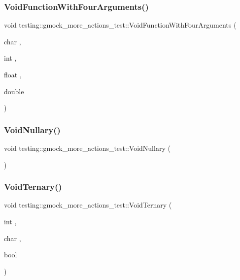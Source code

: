 \subsubsection{\texorpdfstring{Void\+Function\+With\+Four\+Arguments()}{VoidFunctionWithFourArguments()}}
{\footnotesize\ttfamily void testing\+::gmock\+\_\+more\+\_\+actions\+\_\+test\+::\+Void\+Function\+With\+Four\+Arguments (\begin{DoxyParamCaption}\item[{char}]{,  }\item[{int}]{,  }\item[{float}]{,  }\item[{double}]{ }\end{DoxyParamCaption})}

\mbox{\label{namespacetesting_1_1gmock__more__actions__test_a061f6d66383a4e793b4d4ca93bd8ca2f}} 
\subsubsection{\texorpdfstring{Void\+Nullary()}{VoidNullary()}}
{\footnotesize\ttfamily void testing\+::gmock\+\_\+more\+\_\+actions\+\_\+test\+::\+Void\+Nullary (\begin{DoxyParamCaption}{ }\end{DoxyParamCaption})}

\mbox{\label{namespacetesting_1_1gmock__more__actions__test_ac41b49dc8ab365ccad7b332796421cd4}} 
\subsubsection{\texorpdfstring{Void\+Ternary()}{VoidTernary()}}
{\footnotesize\ttfamily void testing\+::gmock\+\_\+more\+\_\+actions\+\_\+test\+::\+Void\+Ternary (\begin{DoxyParamCaption}\item[{int}]{,  }\item[{char}]{,  }\item[{bool}]{ }\end{DoxyParamCaption})}

